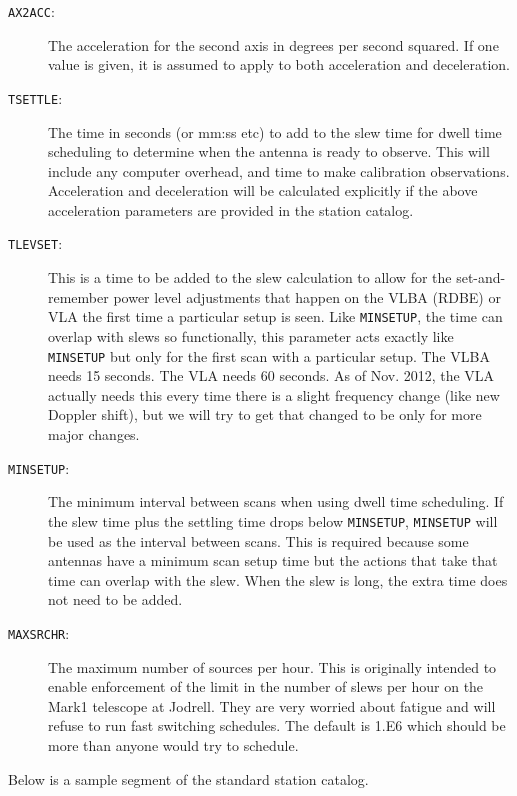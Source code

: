 \documentclass{report}
\begin{document}
\begin{description}
\item [{\tt AX2ACC}:] The acceleration for the second axis in degrees
per second squared.  If one value is given, it is
assumed to apply to both acceleration and deceleration.

\item [{\tt TSETTLE}:] The time in seconds (or mm:ss etc) to add to
the slew time for dwell time scheduling to determine when the antenna
is ready to observe.  This will include any computer overhead,
and time to make calibration observations.  Acceleration and
deceleration will be calculated explicitly if the above acceleration
parameters are provided in the station catalog.

\item [{\tt TLEVSET}:] This is a time to be added to the slew calculation
to allow for the set-and-remember power level adjustments that happen
on the VLBA (RDBE) or VLA the first time a particular setup is seen.
Like {\tt MINSETUP}, the time can overlap with slews so functionally, this
parameter acts exactly like {\tt MINSETUP} but only for the first scan
with a particular setup.  The VLBA needs 15 seconds.  The VLA needs 60
seconds.  As of Nov. 2012, the VLA actually needs this every time there
is a slight frequency change (like new Doppler shift), but we will try 
to get that changed to be only for more major changes.

\item [{\tt MINSETUP}:] The minimum interval between scans when using
dwell time scheduling.  If the slew time plus the settling time
drops below {\tt MINSETUP}, {\tt MINSETUP} will be used as the
interval between scans.  This is required because some antennas have
a minimum scan setup time but the actions that take that time can
overlap with the slew.  When the slew is long, the extra time does
not need to be added.

\item [{\tt MAXSRCHR}:] The maximum number of sources per hour.
This is originally intended to enable enforcement of the limit in
the number of slews per hour on the Mark1 telescope at Jodrell.  They
are very worried about fatigue and will refuse to run fast switching
schedules.  The default is 1.E6 which should be more than anyone
would try to schedule.


\end{description}

Below is a sample segment of the standard station catalog.
\end{document}

